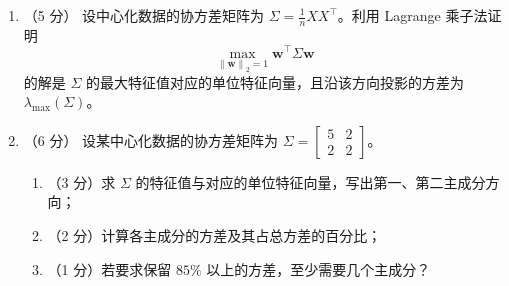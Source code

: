 \documentclass[11pt,a4paper]{exam-zh}
\newcommand{\bvec}[1]{\boldsymbol{#1}}
\begin{document}
\begin{problem}[points = 11]

\begin{enumerate}
    \item （5 分） 设中心化数据的协方差矩阵为 $\Sigma=\frac1nXX^\top$。利用 Lagrange 乘子法证明
    \[
      \max_{\left\|\bvec{w}\right\|_2=1}\bvec{w}^\top\Sigma\bvec{w}
    \]
    的解是 $\Sigma$ 的最大特征值对应的单位特征向量，且沿该方向投影的方差为 $\lambda_{\max}(\Sigma)$。

    \item （6 分） 设某中心化数据的协方差矩阵为
    $\Sigma=\begin{bmatrix}5&2\\2&2\end{bmatrix}$。
    \begin{enumerate}
        \item （3 分）求 $\Sigma$ 的特征值与对应的单位特征向量，写出第一、第二主成分方向；
        \item （2 分）计算各主成分的方差及其占总方差的百分比；
        \item （1 分）若要求保留 $85\%$ 以上的方差，至少需要几个主成分？
    \end{enumerate}
\end{enumerate}
\end{problem}
\end{document}
